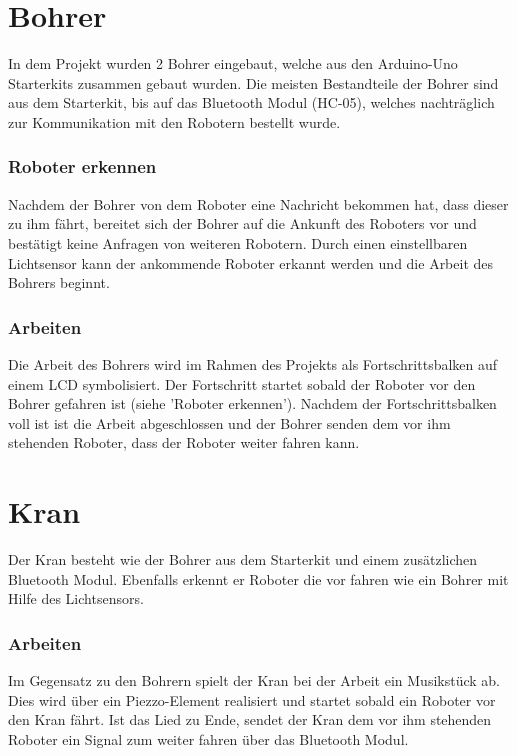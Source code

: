 \section{Bohrer}
In dem Projekt wurden 2 Bohrer eingebaut, welche aus den Arduino-Uno Starterkits zusammen gebaut wurden. Die meisten Bestandteile der Bohrer sind aus dem Starterkit, bis auf das Bluetooth Modul (HC-05), welches nachträglich zur Kommunikation mit den Robotern bestellt wurde.
\subsubsection{Roboter erkennen}
Nachdem der Bohrer von dem Roboter eine Nachricht bekommen hat, dass dieser zu ihm fährt, bereitet sich der Bohrer auf die Ankunft des Roboters vor und bestätigt keine Anfragen von weiteren Robotern. Durch einen einstellbaren Lichtsensor kann der ankommende Roboter erkannt werden und die Arbeit des Bohrers beginnt. 

\subsubsection{Arbeiten}
Die Arbeit des Bohrers wird im Rahmen des Projekts als Fortschrittsbalken auf einem LCD symbolisiert. Der Fortschritt startet sobald der Roboter vor den Bohrer gefahren ist (siehe 'Roboter erkennen'). Nachdem der Fortschrittsbalken voll ist ist die Arbeit abgeschlossen und der Bohrer senden dem vor ihm stehenden Roboter, dass der Roboter weiter fahren kann.

\section{Kran}
Der Kran besteht wie der Bohrer aus dem Starterkit und einem zusätzlichen Bluetooth Modul. Ebenfalls erkennt er Roboter die vor fahren wie ein Bohrer mit Hilfe des Lichtsensors.
\subsubsection{Arbeiten}
Im Gegensatz zu den Bohrern spielt der Kran bei der Arbeit ein Musikstück ab. Dies wird über ein Piezzo-Element realisiert und startet sobald ein Roboter vor den Kran fährt. Ist das Lied zu Ende, sendet der Kran dem vor ihm stehenden Roboter ein Signal zum weiter fahren über das Bluetooth Modul.


